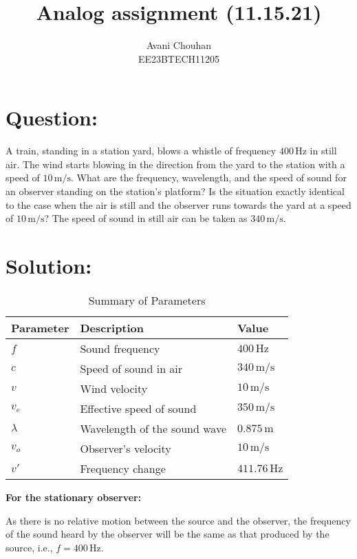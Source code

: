 \documentclass[twocolumn]{article}
\title{Analog assignment (11.15.21)}
\author{Avani Chouhan \\
        EE23BTECH11205}
\date{}  %
\begin{document}
\maketitle

\section*{Question:}
A train, standing in a station yard, blows a whistle of frequency $400 \, \text{Hz}$ in still air. The wind starts blowing in the direction from the yard to the station with a speed of $10 \, \text{m/s}$. What are the frequency, wavelength, and the speed of sound for an observer standing on the station's platform? Is the situation exactly identical to the case when the air is still and the observer runs towards the yard at a speed of $10\, \text{m/s}$? The speed of sound in still air can be taken as $340\, \text{m/s}$.

\section*{Solution:}
\begin{table}[htbp]
  \centering
  \caption{Summary of Parameters}
  \label{tab:parameters}
  \begin{tabularx}{\linewidth}{|X|X|X|}
    \hline
    \textbf{Parameter} & \textbf{Description} & \textbf{Value} \\
    \hline
    $f$ & Sound frequency & $400 \, \text{Hz}$ \\
    \hline
    $c$ & Speed of sound in air & $340 \, \text{m/s}$ \\
    \hline
    $v$& Wind velocity & $10 \, \text{m/s}$ \\
    \hline
    $v_e$ & Effective speed of sound & $350 \, \text{m/s}$ \\
    \hline
    $\lambda$ & Wavelength of the sound wave & $0.875 \, \text{m}$ \\
    \hline
    $v_o$ & Observer's velocity & $10 \, \text{m/s}$ \\
    \hline
    $v'$ & Frequency change & $411.76 \, \text{Hz}$ \\
    \hline
  \end{tabularx}
\end{table}

\textbf{For the stationary observer:}

As there is no relative motion between the source and the observer, the frequency of the sound heard by the observer will be the same as that produced by the source, i.e., $f = 400 \, \text{Hz}$.
\end{document}
